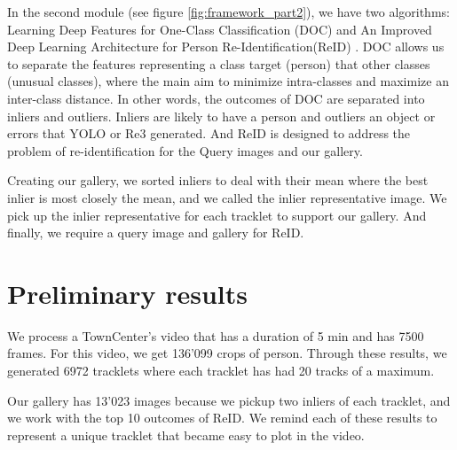 \documentclass[a4paper]{article}
\begin{document}
\leavevmode\newline

In the second module (see figure \ref{fig:framework_part2}), we have two algorithms: Learning Deep Features for One-Class Classification (DOC) \cite{DOC} and An Improved Deep Learning Architecture for Person Re-Identification(ReID) \cite{REID}.  DOC allows us to separate the features representing a class target (person) that other classes (unusual classes), where the main aim to minimize intra-classes and maximize an inter-class distance. In other words, the outcomes of DOC are separated into inliers and outliers. Inliers are likely to have a person and outliers an object or errors that YOLO or Re3 generated. And ReID is designed to address the problem of re-identification for the Query images and our gallery. 

\leavevmode\newline

Creating our gallery, we sorted inliers to deal with their mean where the best inlier is most closely the mean, and we called the inlier representative image. We pick up the inlier representative for each tracklet to support our gallery. And finally, we require a query image and gallery for ReID.

\section{Preliminary results}
We process a TownCenter's video that has a duration of 5 min and has 7500 frames. For this video, we get 136'099 crops of person. Through these results, we generated 6972 tracklets where each tracklet has had 20 tracks of a maximum. 
\leavevmode\newline

Our gallery has 13'023 images because we pickup two inliers of each tracklet, and we work with the top 10 outcomes of ReID. We remind each of these results to represent a unique tracklet that became easy to plot in the video. 
\leavevmode\newline
\end{document}
